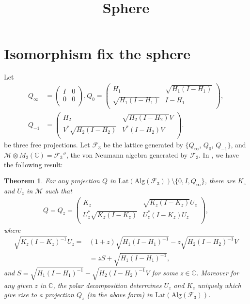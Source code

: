 \documentclass{amsart}
\title{Sphere}
\date{}
\newcommand{\F}{\mathcal F}
\newcommand{\M}{\mathcal M}
\newcommand{\Lat}{\mathrm{Lat}}
\newcommand{\Alg}{\mathrm{Alg}}
\newcommand{\C}{\mathbb C} %
\newtheorem{theorem}{Theorem}[section]
\begin{document}
\section{Isomorphism fix the sphere}
Let
\begin{align*}
Q_{\infty}&= \left(
        \begin{array}{cc}
          I & 0 \\
          0 & 0 \\
        \end{array}
      \right),
Q_{0} = \left(
          \begin{array}{cc}
            H_{1} & \sqrt{H_{1}(I-H_{1})} \\
            \sqrt{H_{1}(I-H_{1})} & I-H_{1} \\
          \end{array}
        \right) , \\
Q_{-1}&= \left(
          \begin{array}{cc}
            H_{2} & \sqrt{H_{2}(I-H_{2})}V \\
            V^{*}\sqrt{H_{2}(I-H_{2})} & V^{*}(I-H_{2})V \\
          \end{array}
        \right) \mbox{.}
\end{align*}
be three free projections. Let $\F_3$ be the lattice generated by $\{Q_{\infty}$, $Q_{0}$, $Q_{-1} \}$,
and $\M \otimes M_2(\C) = \F_3''$, the von Neumann algebra generated by $\F_3$.
In \cite{GYII}, we have the following result:

\begin{theorem}
For any projection $Q$
in $\Lat(\Alg(\F_3)) \setminus \{0, I, Q_{\infty}\}$, there are $K_{z}$ and
$U_{z}$ in $\M$ such that
\begin{align*}
Q = Q_{z} = \left(
     \begin{array}{cc}
      K_{z} & \sqrt{K_{z}(I-K_{z})}U_{z} \\
      U_{z}^{*}\sqrt{K_{z}(I-K_{z})} & U_{z}^{*}(I-K_{z})U_{z} \\
  \end{array}
\right) ,
\end{align*}
where
\begin{equation}\label{(*)}
\begin{split}
\sqrt{K_{z}(I-K_{z})^{-1}}U_{z} = &(1+z)\sqrt{H_{1}(I-H_{1})^{-1}}-
                                   z\sqrt{H_{2}(I-H_{2})^{-1}}V \\
                                 &=zS + \sqrt{H_{1}(I-H_{1})^{-1}},
\end{split}
\end{equation}
and $S = \sqrt{H_{1}(I-H_{1})^{-1}}- \sqrt{H_{2}(I-H_{2})^{-1}}V$
for some $z \in \C$. Moreover for any given
$z$ in $\C$, the polar decomposition determines $U_z$ and $K_z$
uniquely which give rise to a projection $Q_z$ (in the above form)
in $\Lat(\Alg(\F_3))$.
\end{theorem}
\end{document}
